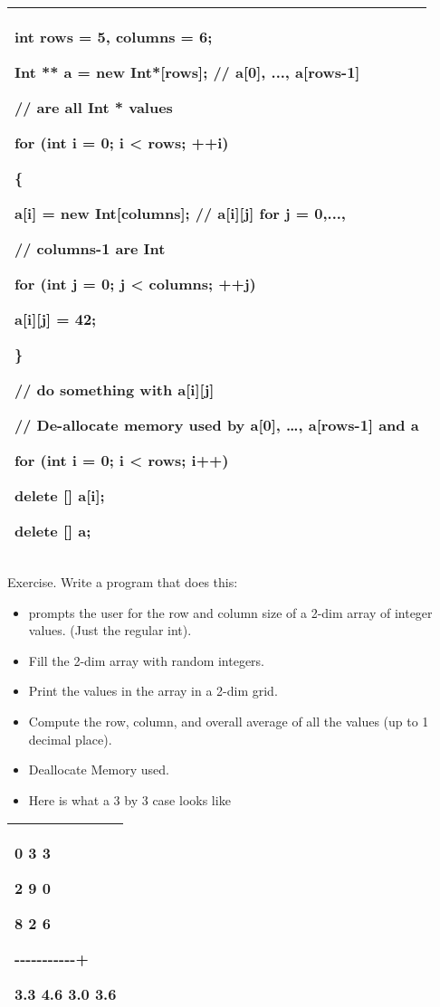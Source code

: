 \documentclass[
]{article}
\providecommand{\tightlist}{%
  \setlength{\itemsep}{0pt}\setlength{\parskip}{0pt}}
\begin{document}
\begin{longtable}[]{@{}l@{}}
\toprule
\endhead
\begin{minipage}[t]{0.97\columnwidth}\raggedright
int rows = 5, columns = 6;

Int ** a = new Int*{[}rows{]}; // a{[}0{]}, ..., a{[}rows-1{]}

// are all Int * values

for (int i = 0; i \textless{} rows; ++i)

\{

a{[}i{]} = new Int{[}columns{]}; // a{[}i{]}{[}j{]} for j = 0,...,

// columns-1 are Int

for (int j = 0; j \textless{} columns; ++j)

a{[}i{]}{[}j{]} = 42;

\}

// do something with a{[}i{]}{[}j{]}

// De-allocate memory used by a{[}0{]}, \ldots, a{[}rows-1{]} and a

for (int i = 0; i \textless{} rows; i++)

delete {[}{]} a{[}i{]};

delete {[}{]} a;\strut
\end{minipage}\tabularnewline
\bottomrule
\end{longtable}

Exercise. Write a program that does this:

\begin{itemize}
\tightlist
\item
  prompts the user for the row and column size of a 2-dim array of
  integer values. (Just the regular int).
\end{itemize}

\begin{itemize}
\tightlist
\item
  Fill the 2-dim array with random integers.
\item
  Print the values in the array in a 2-dim grid.
\item
  Compute the row, column, and overall average of all the values (up to
  1 decimal place).
\item
  Deallocate Memory used.
\item
  Here is what a 3 by 3 case looks like
\end{itemize}

\begin{longtable}[]{@{}l@{}}
\toprule
\endhead
\begin{minipage}[t]{0.97\columnwidth}\raggedright
0 3 3 \textbar2.0

2 9 0 \textbar3.6

8 2 6 \textbar5.3

-\/-\/-\/-\/-\/-\/-\/-\/-\/-\/-+

3.3 4.6 3.0 3.6\strut
\end{minipage}\tabularnewline
\bottomrule
\end{longtable}
\end{document}
